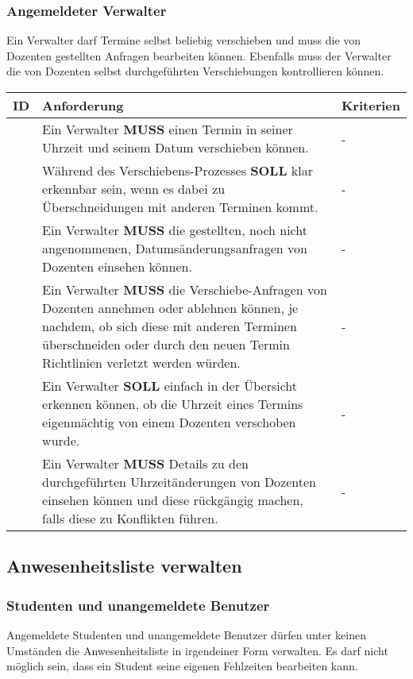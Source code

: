 \newpage

\subsubsection{Angemeldeter Verwalter}
Ein Verwalter darf Termine selbst beliebig verschieben und muss die von Dozenten gestellten Anfragen bearbeiten können. Ebenfalls muss der Verwalter die von Dozenten selbst durchgeführten Verschiebungen kontrollieren können.

\vspace{12pt}

\begin{tabular} {|p{}|p{}|p{}|}
	\hline
	ID & Anforderung & Kriterien \\
	\hline
	\printfreqnr
	& Ein Verwalter \textbf{MUSS} einen Termin in seiner Uhrzeit und seinem Datum verschieben können.
	& - \\
	\hline
	\printfreqnr
	& Während des Verschiebens-Prozesses \textbf{SOLL} klar erkennbar sein, wenn es dabei zu Überschneidungen mit anderen Terminen kommt.
	& - \\
	\hline
	\printfreqnr
	& Ein Verwalter \textbf{MUSS} die gestellten, noch nicht angenommenen, Datumsänderungsanfragen von Dozenten einsehen können.
	& - \\
	\hline
	\printfreqnr
	& Ein Verwalter \textbf{MUSS} die Verschiebe-Anfragen von Dozenten annehmen oder ablehnen können, je nachdem, ob sich diese mit anderen Terminen überschneiden oder durch den neuen Termin Richtlinien verletzt werden würden.
	& - \\
	\hline
	\printfreqnr
	& Ein Verwalter \textbf{SOLL} einfach in der Übersicht erkennen können, ob die Uhrzeit eines Termins eigenmächtig von einem Dozenten verschoben wurde.
	& - \\
	\hline
	\printfreqnr
	& Ein Verwalter \textbf{MUSS} Details zu den durchgeführten Uhrzeitänderungen von Dozenten einsehen können und diese rückgängig machen, falls diese zu Konflikten führen.
	& - \\
	\hline
\end{tabular}

\newpage

\subsection{Anwesenheitsliste verwalten}

\subsubsection{Studenten und unangemeldete Benutzer}
Angemeldete Studenten und unangemeldete Benutzer dürfen unter keinen Umständen die Anwesenheitsliste in irgendeiner Form verwalten. Es darf nicht möglich sein, dass ein Student seine eigenen Fehlzeiten bearbeiten kann.

